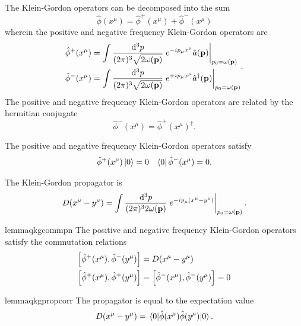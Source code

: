 \begin{definition}
	The Klein-Gordon operators can be decomposed into the sum
	\begin{equation}
		\hat\phi(x^\mu)
		=
		\hat\phi^+(x^\mu)
		+
		\hat\phi^-(x^\mu)
	\end{equation}
	wherein the positive and negative frequency Klein-Gordon operators are
	\begin{equation}
		\begin{split}
			\hat\phi^+(x^\mu)
			&=
			\int\frac{\dd[3]{p}}{(2\pi)^3\sqrt{2\omega(\vb{p})}}
			\eval{
				e^{-ip_\mu x^\mu}
				\hat{a}(\vb{p})
			}_{p_0=\omega(\vb{p})}
			\\
			\hat\phi^-(x^\mu)
			&=
			\int\frac{\dd[3]{p}}{(2\pi)^3\sqrt{2\omega(\vb{p})}}
			\eval{
				e^{+ip_\mu x^\mu}
				\hat{a}^\dagger(\vb{p})
			}_{p_0=\omega(\vb{p})}
		\end{split}
		\label{eq:qkg_positive_negative_frequency}
		.
	\end{equation}
	The positive and negative frequency Klein-Gordon operators are related by the hermitian conjugate
	\begin{equation}
		\hat\phi^-(x^\mu)
		=
		\hat\phi^+(x^\mu)^\dagger
		.
	\end{equation}
\end{definition}
\begin{corollary}\label{thm:vacuum_state_pn}
	The positive and negative frequency Klein-Gordon operators satisfy
	\begin{align}
		\hat\phi^+(x^\mu)
		\ket{0}
		=
		0
		&&
		\bra{0}
		\hat\phi^-(x^\mu)
		=
		0
		\label{eq:vacuum_state_pn}
		.
	\end{align}
\end{corollary}
\begin{definition}
	The Klein-Gordon propagator is
	\begin{equation}
		D(x^\mu-y^\mu)
		=
		\int\frac{\dd[3]{p}}{(2\pi)^32\omega(\vb{p})}
		\eval{
			e^{-ip_\mu (x^\mu-y^\mu)}
		}_{p_0=\omega(\vb{p})}
		.
	\end{equation}
\end{definition}
\begin{restatable}{lemma}{qkgcommpn}\label{thm:qkg_comm_pn}
	The positive and negative frequency Klein-Gordon operators satisfy the commutation relations
	\begin{align}
		\comm{\hat\phi^+(x^\mu)}{\hat\phi^-(y^\mu)}
		&=
		D(x^\mu-y^\mu)
		\\
		\comm{\hat\phi^+(x^\mu)}{\hat\phi^+(y^\mu)}
		&=
		\comm{\hat\phi^-(x^\mu)}{\hat\phi^-(y^\mu)}
		=
		0
	\end{align}
\end{restatable}
\begin{restatable}{lemma}{qkgpropcorr}\label{thm:qkg_prop_corr}
	The propagator is equal to the expectation value
	\begin{equation}
		D(x^\mu-y^\mu)
		=
		\expval{\hat\phi(x^\mu)\hat\phi(y^\mu)}{0}
		.
	\end{equation}
\end{restatable}